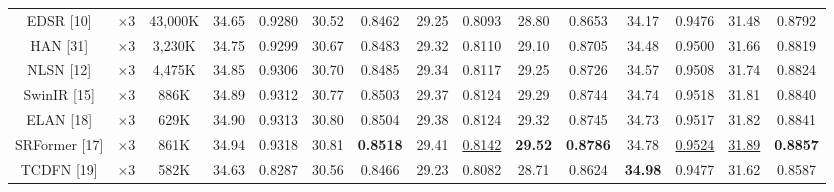 \documentclass{ieeeaccess}
\begin{document}
\begin{table}
\begin{tabular}{|c|c|c|cc|cc|cc|cc|cc|cc|}

EDSR [10]& $\times3$&43,000K& \multicolumn{1}{c|}{34.65} & 0.9280 & \multicolumn{1}{c|}{30.52} & 0.8462 &\multicolumn{1}{c|}{29.25} & 0.8093& \multicolumn{1}{c|}{28.80} & 0.8653 & \multicolumn{1}{c|}{34.17} & 0.9476
&\multicolumn{1}{c|}{31.48} &0.8792\\

HAN [31] & $\times3$&3,230K& \multicolumn{1}{c|}{34.75} & 0.9299 & \multicolumn{1}{c|}{30.67} & 0.8483 &\multicolumn{1}{c|}{29.32} & 0.8110 & \multicolumn{1}{c|}{29.10} & 0.8705 & \multicolumn{1}{c|}{34.48} & 0.9500
&\multicolumn{1}{c|}{31.66} &0.8819\\

NLSN [12] & $\times3$ &4,475K& \multicolumn{1}{c|}{34.85} & 0.9306& \multicolumn{1}{c|}{30.70} &0.8485 &\multicolumn{1}{c|}{29.34} & 0.8117& \multicolumn{1}{c|}{29.25} & 0.8726& \multicolumn{1}{c|}{34.57} & 0.9508
&\multicolumn{1}{c|}{31.74} &0.8824\\

SwinIR [15] & $\times3$ &886K& \multicolumn{1}{c|}{34.89} & {0.9312} & \multicolumn{1}{c|}{30.77} &{0.8503} & \multicolumn{1}{c|}{29.37} & {0.8124} & \multicolumn{1}{c|}{29.29} & {0.8744}& \multicolumn{1}{c|}{34.74} &{0.9518} &\multicolumn{1}{c|}{31.81} & {0.8840}\\

ELAN [18] & $\times 3$ &629K& \multicolumn{1}{c|}{34.90} & 0.9313 & \multicolumn{1}{c|}{30.80} & 0.8504 & \multicolumn{1}{c|}{29.38} & 0.8124 & \multicolumn{1}{c|}{29.32} &0.8745 & \multicolumn{1}{c|}{34.73} & 0.9517
&\multicolumn{1}{c|}{31.82} & 0.8841\\

SRFormer [17] & $\times 3$ &861K& \multicolumn{1}{c|}{34.94} & {0.9318} & \multicolumn{1}{c|}{30.81} &{\color{red}\textbf{ 0.8518}} & \multicolumn{1}{c|}{29.41} & {\color{blue}\underline{0.8142}} & \multicolumn{1}{c|}{\color{red}\textbf{29.52}} & {\color{red}\textbf{0.8786}} & \multicolumn{1}{c|}{34.78} &{\color{blue}\underline{0.9524}} &\multicolumn{1}{c|}{\color{blue}\underline{31.89}} & {\color{red}\textbf{ 0.8857}}\\

TCDFN [19] & $\times 3$ &582K& \multicolumn{1}{c|}{34.63} & 0.8287 & \multicolumn{1}{c|}{30.56} & 0.8466 & \multicolumn{1}{c|}{29.23} & 0.8082 & \multicolumn{1}{c|}{28.71} &0.8624 & \multicolumn{1}{c|}{\color{red}\textbf{34.98}} & 0.9477
&\multicolumn{1}{c|}{31.62} & 0.8587\\


\end{tabular}
\end{table}
\end{document}
